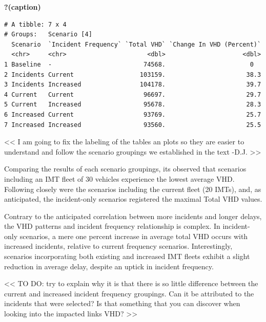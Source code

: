 \documentclass[
  letterpaper,
  authoryear]{elsarticle}
\begin{document}
\begin{table}

\caption{\textbf{?(caption)}}\begin{minipage}[t]{\linewidth}

{\centering 

\begin{verbatim}
# A tibble: 7 x 4
# Groups:   Scenario [4]
  Scenario  `Incident Frequency` `Total VHD` `Change In VHD (Percent)`
  <chr>     <chr>                      <dbl>                     <dbl>
1 Baseline  -                         74568.                       0  
2 Incidents Current                  103159.                      38.3
3 Incidents Increased                104178.                      39.7
4 Current   Current                   96697.                      29.7
5 Current   Increased                 95678.                      28.3
6 Increased Current                   93769.                      25.7
7 Increased Increased                 93560.                      25.5
\end{verbatim}

}

\end{minipage}%

\end{table}

\textless\textless{} I am going to fix the labeling of the tables an
plots so they are easier to understand and follow the scenario groupings
we established in the text -D.J. \textgreater\textgreater{}

Comparing the results of each scenario groupings, its observed that
scenarios including an IMT fleet of 30 vehicles experience the lowest
average VHD. Following closely were the scenarios including the current
fleet (20 IMTs), and, as anticipated, the incident-only scenarios
registered the maximal Total VHD values.

Contrary to the anticipated correlation between more incidents and
longer delays, the VHD patterns and incident frequency relationship is
complex. In incident-only scenarios, a mere one percent increase in
average total VHD occurs with increased incidents, relative to current
frequency scenarios. Interestingly, scenarios incorporating both
existing and increased IMT fleets exhibit a slight reduction in average
delay, despite an uptick in incident frequency.

\textless\textless{} TO DO: try to explain why it is that there is so
little difference between the current and increased incident frequency
groupings. Can it be attributed to the incidents that were selected? Is
that something that you can discover when looking into the impacted
links VHD? \textgreater\textgreater{}
\end{document}
